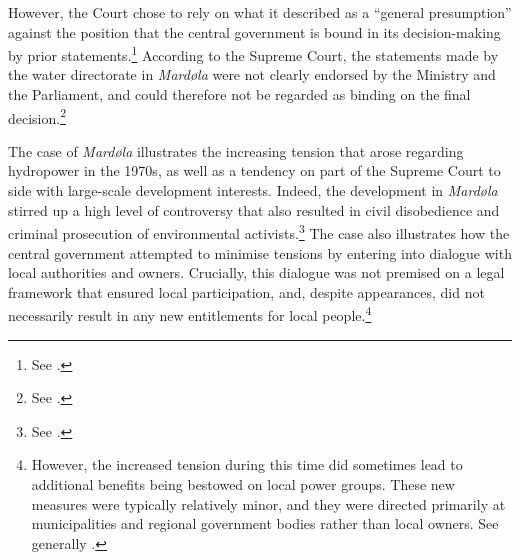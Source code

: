 However, the Court chose to rely on what it described as a ``general presumption'' against the position that the central government is bound in its decision-making by prior statements.\footnote{See \cite[110]{mardola73}.} According to the Supreme Court, the statements made by the water directorate in {\it Mardøla} were not clearly endorsed by the Ministry and the Parliament, and could therefore not be regarded as binding on the final decision.\footnote{See \cite[111]{mardola73}.} 


The case of {\it Mardøla} illustrates the increasing tension that arose regarding hydropower in the 1970s, as well as a tendency on part of the Supreme Court to side with large-scale development interests. Indeed, the development in {\it Mardøla} stirred up a high level of controversy that also resulted in civil disobedience and criminal prosecution of environmental activists.\footnote{See \cite{mar71}.} The case also illustrates how the central government attempted to minimise tensions by entering into dialogue with local authorities and owners. Crucially, this dialogue was not premised on a legal framework that ensured local participation, and, despite appearances, did not necessarily result in any new entitlements for local people.\footnote{However, the increased tension during this time did sometimes lead to additional benefits being bestowed on local power groups. These new measures were typically relatively minor, and they were directed primarily at municipalities and regional government bodies rather than local owners. See generally \cite[75-76]{nilsen08}.}


